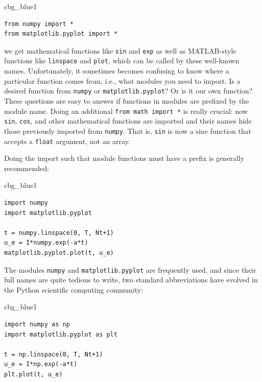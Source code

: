 \documentclass[%
oneside,                 %
final,                   %
10pt]{article}
\newenvironment{_cod_tight}[1]{
   \def\FrameCommand{\colorbox{#1}}
   \FrameRule0.6pt\MakeFramed {\FrameRestore}\vskip3mm}
   {\vskip0mm\endMakeFramed}
\newenvironment{cod}[1]{
\bgroup\rmfamily
\fboxsep=0mm\relax
\begin{_cod_tight}{#1}
\list{}{\parsep=-2mm\parskip=0mm\topsep=0pt\leftmargin=2mm
\rightmargin=2\leftmargin\leftmargin=4pt\relax}
\item\relax}
{\endlist\end{_cod_tight}\egroup}
\begin{document}
\begin{cod}{cbg_blue1}\begin{Verbatim}[numbers=none,fontsize=\fontsize{9pt}{9pt},baselinestretch=0.95,xleftmargin=2mm]
from numpy import *
from matplotlib.pyplot import *
\end{Verbatim}
\end{cod}
\noindent
we get mathematical functions like \texttt{sin} and \texttt{exp} as well as
MATLAB-style functions like \texttt{linspace} and \texttt{plot}, which can be called
by these well-known names.  Unfortunately, it sometimes becomes
confusing to know where a particular function comes from, i.e., what
modules you need to import. Is a desired function from \texttt{numpy} or
\texttt{matplotlib.pyplot}? Or is it our own function?  These questions are
easy to answer if functions in modules are prefixed by the module
name. Doing an additional \texttt{from math import *} is really crucial: now
\texttt{sin}, \texttt{cos}, and other mathematical functions are imported and their
names hide those previously imported from \texttt{numpy}.  That is, \texttt{sin} is
now a sine function that accepts a \texttt{float} argument, not an array.

Doing the import such that module functions must have a prefix
is generally recommended:

\begin{cod}{cbg_blue1}\begin{Verbatim}[numbers=none,fontsize=\fontsize{9pt}{9pt},baselinestretch=0.95,xleftmargin=2mm]
import numpy
import matplotlib.pyplot

t = numpy.linspace(0, T, Nt+1)
u_e = I*numpy.exp(-a*t)
matplotlib.pyplot.plot(t, u_e)
\end{Verbatim}
\end{cod}
\noindent

The modules \texttt{numpy} and \texttt{matplotlib.pyplot} are frequently used,
and since their full names are quite tedious to write,
two standard abbreviations
have evolved in the Python scientific computing community:

\begin{cod}{cbg_blue1}\begin{Verbatim}[numbers=none,fontsize=\fontsize{9pt}{9pt},baselinestretch=0.95,xleftmargin=2mm]
import numpy as np
import matplotlib.pyplot as plt

t = np.linspace(0, T, Nt+1)
u_e = I*np.exp(-a*t)
plt.plot(t, u_e)
\end{Verbatim}
\end{cod}
\noindent
\end{document}
